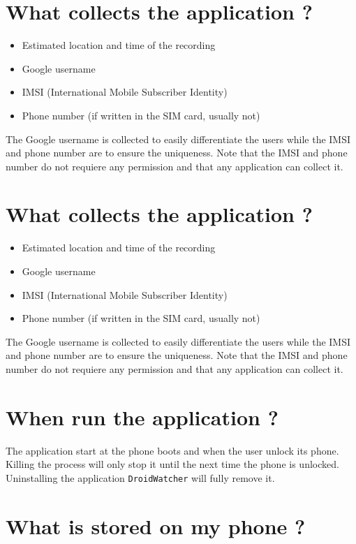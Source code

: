 \documentclass{article}
\begin{document}
\section{What collects the application ?}

\begin{itemize}
\item Estimated location and time of the recording
\item Google username
\item IMSI (International Mobile Subscriber Identity)
\item Phone number (if written in the SIM card, usually not)
\end{itemize}

The Google username is collected to easily differentiate the users while the IMSI and phone number are to ensure the uniqueness.
Note that the IMSI and phone number do not requiere any permission and that any application can collect it.

\section{What collects the application ?}

\begin{itemize}
\item Estimated location and time of the recording
\item Google username
\item IMSI (International Mobile Subscriber Identity)
\item Phone number (if written in the SIM card, usually not)
\end{itemize}

The Google username is collected to easily differentiate the users while the IMSI and phone number are to ensure the uniqueness.
Note that the IMSI and phone number do not requiere any permission and that any application can collect it.

\section{When run the application ?}

The application start at the phone boots and when the user unlock its phone. Killing the process will only stop it until the next time the phone is unlocked. Uninstalling the application \texttt{DroidWatcher} will fully remove it.

\section{What is stored on my phone ?}
\end{document}
